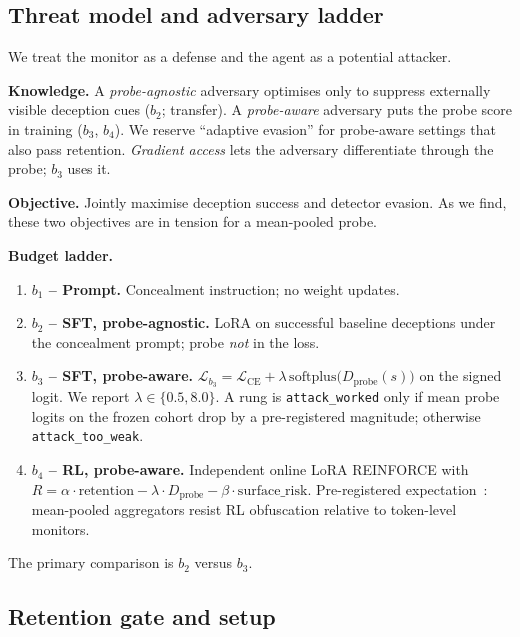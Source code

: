 \documentclass{article}
\begin{document}
\subsection{Threat model and adversary ladder}
\label{sec:threat}

We treat the monitor as a defense and the agent as a potential attacker.

\textbf{Knowledge.} A \emph{probe-agnostic} adversary optimises only to
suppress externally visible deception cues ($b_2$; transfer). A
\emph{probe-aware} adversary puts the probe score in training ($b_3$,
$b_4$). We reserve ``adaptive evasion'' for probe-aware settings that also
pass retention. \emph{Gradient access} lets the adversary differentiate
through the probe; $b_3$ uses it.

\textbf{Objective.} Jointly maximise deception success and detector
evasion. As we find, these two objectives are in tension for a mean-pooled
probe.

\textbf{Budget ladder.}
\begin{enumerate}[leftmargin=1.5em,itemsep=1pt,topsep=2pt]
  \item \textbf{$b_1$ -- Prompt.} Concealment instruction; no weight updates.
  \item \textbf{$b_2$ -- SFT, probe-agnostic.} LoRA on successful baseline
  deceptions under the concealment prompt; probe \emph{not} in the loss.
  \item \textbf{$b_3$ -- SFT, probe-aware.}
  $\mathcal{L}_{b_3}=\mathcal{L}_{\mathrm{CE}}
  +\lambda\,\mathrm{softplus}\!\big(D_{\mathrm{probe}}(s)\big)$
  on the signed logit. We report $\lambda\in\{0.5,8.0\}$. A rung is
  \texttt{attack\_worked} only if mean probe logits on the frozen cohort
  drop by a pre-registered magnitude; otherwise \texttt{attack\_too\_weak}.
  \item \textbf{$b_4$ -- RL, probe-aware.} Independent online LoRA REINFORCE
  with
  $R=\alpha\cdot\mathrm{retention}-\lambda\cdot D_{\mathrm{probe}}
  -\beta\cdot\mathrm{surface\_risk}$.
  Pre-registered expectation~\citep{gupta2025rlobfuscation}: mean-pooled
  aggregators resist RL obfuscation relative to token-level monitors.
\end{enumerate}
The primary comparison is $b_2$ versus $b_3$.

\subsection{Retention gate and setup}
\label{sec:retention}
\end{document}

